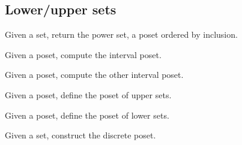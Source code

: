 \subsection{Lower/upper sets}


\begin{codeexercise}
    Given a set, return the power set, a poset ordered by inclusion.

\end{codeexercise}

\begin{codeexercise}
    Given a poset, compute the interval poset.

\end{codeexercise}

\begin{codeexercise}
    Given a poset, compute the other interval poset.

\end{codeexercise}

\begin{codeexercise}
    Given a poset, define the poset of upper sets.

\end{codeexercise}

\begin{codeexercise}
    Given a poset, define the poset of lower sets.
\end{codeexercise}

\begin{codeexercise}
    Given a set, construct the discrete poset.

\end{codeexercise}
%
%
